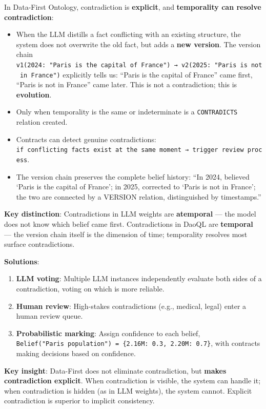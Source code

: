 \documentclass[11pt,a4paper]{article}
\begin{document}
In Data-First Ontology, contradiction is \textbf{explicit}, and
\textbf{temporality can resolve contradiction}:

\begin{itemize}
\tightlist
\item
  When the LLM distills a fact conflicting with an existing structure,
  the system does not overwrite the old fact, but adds a \textbf{new
  version}. The version chain
  \texttt{v1(2024:\ "Paris\ is\ the\ capital\ of\ France")\ →\ v2(2025:\ "Paris\ is\ not\ in\ France")}
  explicitly tells us: ``Paris is the capital of France'' came first,
  ``Paris is not in France'' came later. This is not a contradiction;
  this is \textbf{evolution}.
\item
  Only when temporality is the same or indeterminate is a
  \texttt{CONTRADICTS} relation created.
\item
  Contracts can detect genuine contradictions:
  \texttt{if\ conflicting\ facts\ exist\ at\ the\ same\ moment\ →\ trigger\ review\ process}.
\item
  The version chain preserves the complete belief history: ``In 2024,
  believed `Paris is the capital of France'; in 2025, corrected to
  `Paris is not in France'; the two are connected by a VERSION relation,
  distinguished by timestamps.''
\end{itemize}

\textbf{Key distinction}: Contradictions in LLM weights are
\textbf{atemporal} --- the model does not know which belief came first.
Contradictions in DaoQL are \textbf{temporal} --- the version chain
itself is the dimension of time; temporality resolves most surface
contradictions.

\textbf{Solutions}:

\begin{enumerate}
\def\labelenumi{\arabic{enumi}.}
\tightlist
\item
  \textbf{LLM voting}: Multiple LLM instances independently evaluate
  both sides of a contradiction, voting on which is more reliable.
\item
  \textbf{Human review}: High-stakes contradictions (e.g., medical,
  legal) enter a human review queue.
\item
  \textbf{Probabilistic marking}: Assign confidence to each belief,
  \texttt{Belief("Paris\ population")\ =\ \{2.16M:\ 0.3,\ 2.20M:\ 0.7\}},
  with contracts making decisions based on confidence.
\end{enumerate}

\textbf{Key insight}: Data-First does not eliminate contradiction, but
\textbf{makes contradiction explicit}. When contradiction is visible,
the system can handle it; when contradiction is hidden (as in LLM
weights), the system cannot. Explicit contradiction is superior to
implicit consistency.
\end{document}
